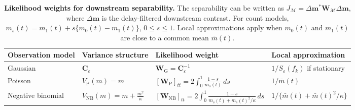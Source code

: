 \begin{table}[!t]
\centering
\caption{ \textbf{Likelihood weights for downstream separability.} The separability can be written as \(J_{\mathcal M}=\Delta\mathbf m^*\mathbf W_{\mathcal M}\Delta\mathbf m\), where \(\Delta\mathbf m\) is the delay-filtered downstream contrast. For count models, \(m_s(t)=m_1(t)+s\{m_0(t)-m_1(t)\}\), \(0\le s\le1\). Local approximations apply when \(m_0(t)\) and \(m_1(t)\) are close to a common mean \(\bar m(t)\). }
\label{tab:noise-models}
\begin{tabular}{llll}
\hline
Observation model
&
Variance structure
&
Likelihood weight
&
Local approximation
\\
\hline

Gaussian
&
\(\mathbf C_\varepsilon\)
&
\(\mathbf W_{\mathrm G}=\mathbf C_\varepsilon^{-1}\)
&
\(1/S_\varepsilon(f_k)\) if stationary
\\[8pt]

Poisson
&
\(V_{\mathrm P}(m)=m\)
&
\(\displaystyle
[\mathbf W_{\mathrm P}]_{tt}
=2\int_0^1\frac{1-s}{m_s(t)}\,ds\)
&
\(\displaystyle 1/\bar m(t)\)
\\[10pt]

Negative binomial
&
\(\displaystyle V_{\mathrm{NB}}(m)=m+\frac{m^2}{\kappa}\)
&
\(\displaystyle
[\mathbf W_{\mathrm{NB}}]_{tt}
=2\int_0^1
\frac{1-s}{m_s(t)+m_s(t)^2/\kappa}\,ds\)
&
\(\displaystyle
1/\{\bar m(t)+\bar m(t)^2/\kappa\}\)
\\[10pt]

\hline
\end{tabular}
\end{table}
